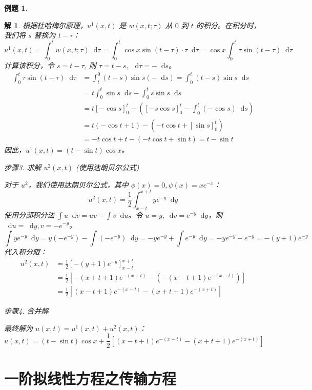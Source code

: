 \documentclass[12pt,a4paper]{article}
\newcommand{\diff}{\mathop{}\!\mathrm{d}}
\numberwithin{subsection}{section}   %
\numberwithin{subsubsection}{subsection}
\theoremstyle{plain}
\newtheorem{solution}{解}[subsection]  %
\theoremstyle{definition}
\newtheorem{example}{例题}[subsection]  %
\theoremstyle{remark}
\theoremstyle{remark}
\begin{document}
\begin{example}
\begin{solution}
		\noindent
		根据杜哈梅尔原理，$u^1(x,t)$ 是 $w(x,t;\tau)$ 从 $0$ 到 $t$ 的积分。在积分时，我们将 $s$ 替换为 $t-\tau$：
		\[
		u^1(x,t) = \int_0^t w(x,t;\tau) \diff \tau = \int_0^t \cos x \sin(t-\tau) \cdot \tau \diff \tau = \cos x \int_0^t \tau \sin(t-\tau) \diff \tau
		\]
		计算该积分，令 $s = t-\tau$, 则 $\tau = t-s$, $\diff \tau = -\diff s$。
		\begin{align*}
			\int_0^t \tau \sin(t-\tau) \diff \tau &= \int_t^0 (t-s)\sin s (-\diff s) = \int_0^t (t-s)\sin s \diff s \\
			&= t \int_0^t \sin s \diff s - \int_0^t s\sin s \diff s \\
			&= t [-\cos s]_0^t - \left( [-s\cos s]_0^t - \int_0^t (-\cos s) \diff s \right) \\
			&= t(-\cos t + 1) - \left( -t\cos t + [\sin s]_0^t \right) \\
			&= -t\cos t + t - (-t\cos t + \sin t) = t - \sin t
		\end{align*}
		因此，$u^1(x,t) = (t-\sin t)\cos x$。
		
	
		
	步骤3. 求解 $u^2(x,t)$ (使用达朗贝尔公式)
		
		\noindent
		对于 $u^2$，我们使用达朗贝尔公式，其中 $\phi(x)=0, \psi(x)=xe^{-x}$：
		\[
		u^2(x,t) = \frac{1}{2} \int_{x-t}^{x+t} y e^{-y} \diff y
		\]
		使用分部积分法 $\int u \diff v = uv - \int v \diff u$。令 $u=y, \diff v = e^{-y}\diff y$，则 $\diff u = \diff y, v = -e^{-y}$。
		\[
		\int y e^{-y} \diff y = y(-e^{-y}) - \int (-e^{-y}) \diff y = -y e^{-y} + \int e^{-y} \diff y = -y e^{-y} - e^{-y} = -(y+1)e^{-y}
		\]
		代入积分限：
		\begin{align*}
			u^2(x,t) &= \frac{1}{2} \left[ -(y+1)e^{-y} \right]_{x-t}^{x+t} \\
			&= \frac{1}{2} \left[ -(x+t+1)e^{-(x+t)} - (-(x-t+1)e^{-(x-t)}) \right] \\
			&= \frac{1}{2} \left[ (x-t+1)e^{-(x-t)} - (x+t+1)e^{-(x+t)} \right]
		\end{align*}
		
	步骤4. 合并解
		
		\noindent
		最终解为 $u(x,t) = u^1(x,t) + u^2(x,t)$：
		\[
		u(x,t) = (t-\sin t)\cos x + \frac{1}{2} \left[ (x-t+1)e^{-(x-t)} - (x+t+1)e^{-(x+t)} \right]
		\]
		\end{solution}
	\end{example}

	
	
	
	
	
	\newpage
	\section{一阶拟线性方程之传输方程} 
\end{document}
